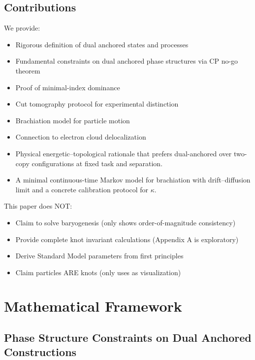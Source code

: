 \documentclass[11pt]{article}
\theoremstyle{plain}
\theoremstyle{definition}
\begin{document}
\subsection{Contributions}
We provide:
\begin{itemize}
  \item Rigorous definition of dual anchored states and processes
  \item Fundamental constraints on dual anchored phase structures via CP no-go theorem
  \item Proof of minimal-index dominance
  \item Cut tomography protocol for experimental distinction
  \item Brachiation model for particle motion
  \item Connection to electron cloud delocalization
  \item Physical energetic--topological rationale that prefers dual-anchored over two-copy configurations at fixed task and separation.
  \item A minimal continuous-time Markov model for brachiation with drift--diffusion limit and a concrete calibration protocol for $\kappa$.
\end{itemize}

\begin{tcolorbox}[title=Scope Limitations, colback=red!5!white]
  This paper does NOT:
  \begin{itemize}
    \item Claim to solve baryogenesis (only shows order-of-magnitude consistency)
    \item Provide complete knot invariant calculations (Appendix A is exploratory)
    \item Derive Standard Model parameters from first principles
    \item Claim particles ARE knots (only uses as visualization)
  \end{itemize}
\end{tcolorbox}

\section{Mathematical Framework}
\label{sec:framework}
\subsection{Phase Structure Constraints on Dual Anchored Constructions}\label{subsec:cp-nogo}
\end{document}
